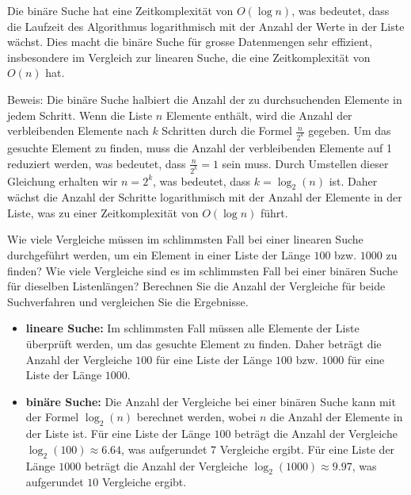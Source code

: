 \begin{myremark}
	Die binäre Suche hat eine Zeitkomplexität von $O(\log n)$, was bedeutet, dass die Laufzeit des Algorithmus logarithmisch mit der Anzahl der Werte in der Liste wächst. Dies macht die binäre Suche für grosse Datenmengen sehr effizient, insbesondere im Vergleich zur linearen Suche, die eine Zeitkomplexität von $O(n)$ hat.

	Beweis:
	Die binäre Suche halbiert die Anzahl der zu durchsuchenden Elemente in jedem Schritt. Wenn die Liste $n$ Elemente enthält, wird die Anzahl der verbleibenden Elemente nach $k$ Schritten durch die Formel $\frac{n}{2^k}$ gegeben. Um das gesuchte Element zu finden, muss die Anzahl der verbleibenden Elemente auf 1 reduziert werden, was bedeutet, dass $\frac{n}{2^k} = 1$ sein muss. Durch Umstellen dieser Gleichung erhalten wir $n = 2^k$, was bedeutet, dass $k = \log_2(n)$ ist. Daher wächst die Anzahl der Schritte logarithmisch mit der Anzahl der Elemente in der Liste, was zu einer Zeitkomplexität von $O(\log n)$ führt.
\end{myremark}

\begin{mychallenge}
	Wie viele Vergleiche müssen im schlimmsten Fall bei einer linearen Suche durchgeführt werden, um ein Element in einer Liste der Länge $100$ bzw. $1000$ zu finden? Wie viele Vergleiche sind es im schlimmsten Fall bei einer binären Suche für dieselben Listenlängen? Berechnen Sie die Anzahl der Vergleiche für beide Suchverfahren und vergleichen Sie die Ergebnisse.
	\begin{myanswer}
		\begin{itemize}
			\item \textbf{lineare Suche:} Im schlimmsten Fall müssen alle Elemente der Liste überprüft werden, um das gesuchte Element zu finden. Daher beträgt die Anzahl der Vergleiche $100$ für eine Liste der Länge $100$ bzw. $1000$ für eine Liste der Länge $1000$.
			\item \textbf{binäre Suche:} Die Anzahl der Vergleiche bei einer binären Suche kann mit der Formel $\log_2(n)$ berechnet werden, wobei $n$ die Anzahl der Elemente in der Liste ist. Für eine Liste der Länge $100$ beträgt die Anzahl der Vergleiche $\log_2(100) \approx 6.64$, was aufgerundet $7$ Vergleiche ergibt. Für eine Liste der Länge $1000$ beträgt die Anzahl der Vergleiche $\log_2(1000) \approx 9.97$, was aufgerundet $10$ Vergleiche ergibt.
		\end{itemize}
	\end{myanswer}
\end{mychallenge}

